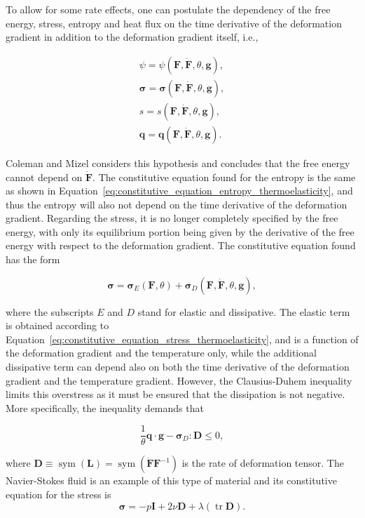 To allow for some rate effects, one can postulate the dependency of the free energy, stress, entropy and heat flux on the time derivative of the deformation gradient in addition to the deformation gradient itself, i.e.,
\begin{highlight}[innertopmargin=-5pt]
  \begin{gather}
\psi = \psi(\mathbf F, \dot{\mathbf F}, \theta, \mathbf g),\\
\bm \sigma = \bm \sigma(\mathbf F, \dot{\mathbf F}, \theta, \mathbf g),\\
s = s(\mathbf F, \dot{\mathbf F}, \theta, \mathbf g),\\
\mathbf q = \mathbf q(\mathbf F, \dot{\mathbf F}, \theta, \mathbf g).
\end{gather}
\end{highlight}
Coleman and Mizel \citep{colemanExistenceCaloricEquations1964} considers this hypothesis and concludes that the free energy cannot depend on $\dot{\mathbf F}$.
The constitutive equation found for the entropy is the same as shown in Equation~\eqref{eq:constitutive_equation_entropy_thermoelasticity}, and thus the entropy will also not depend on the time derivative of the deformation gradient.
Regarding the stress, it is no longer completely specified by the free energy, with only its equilibrium portion being given by the derivative of the free energy with respect to the deformation gradient.
The constitutive equation found has the form
\begin{highlight}
  \begin{equation}
    \bm \sigma = \bm \sigma_E(\mathbf F, \theta) + \bm \sigma_D(\mathbf F, \dot{\mathbf F}, \theta, \mathbf g),
  \end{equation}
\end{highlight}
where the subscripts $E$ and $D$ stand for elastic and dissipative.
The elastic term is obtained according to Equation~\eqref{eq:constitutive_equation_stress_thermoelasticity}, and is a function of the deformation gradient and the temperature only, while the additional dissipative term can depend also on both the time derivative of the deformation gradient and the temperature gradient.
However, the Clausius-Duhem inequality limits this overstress as it must be ensured that the dissipation is not negative.
More specifically, the inequality demands that
\begin{highlight}
  \begin{equation}
    \frac{1}{\theta}\mathbf q\cdot \mathbf g - \bm \sigma_D:\mathbf D\leq 0,
  \end{equation}
\end{highlight}
where $\mathbf D\equiv\operatorname{sym}(\mathbf L) = \operatorname{sym}(\dot{\mathbf F}\mathbf F^{-1})$ is the rate of deformation tensor.
The Navier-Stokes fluid is an example of this type of material and its constitutive equation for the stress is
\begin{equation}
  \bm \sigma = -p\mathbf I + 2\nu \mathbf D + \lambda (\operatorname{tr}\mathbf D).
\end{equation}

